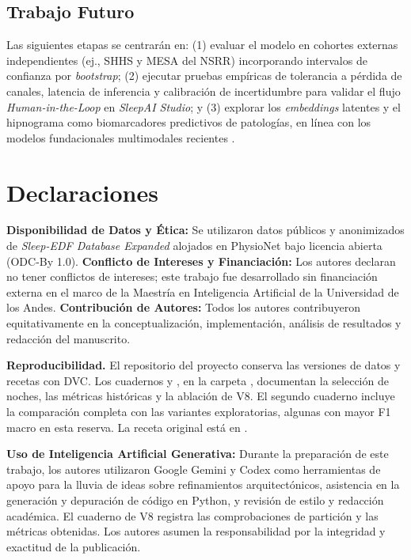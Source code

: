 \documentclass[conference]{IEEEtran}
\begin{document}
\subsection{Trabajo Futuro}
Las siguientes etapas se centrarán en: (1) evaluar el modelo en cohortes externas independientes (ej., SHHS y MESA del NSRR) incorporando intervalos de confianza por \textit{bootstrap}; (2) ejecutar pruebas empíricas de tolerancia a pérdida de canales, latencia de inferencia y calibración de incertidumbre para validar el flujo \textit{Human-in-the-Loop} en \textit{SleepAI Studio}; y (3) explorar los \textit{embeddings} latentes y el hipnograma como biomarcadores predictivos de patologías, en línea con los modelos fundacionales multimodales recientes \cite{thapa2026nature}.

\section*{Declaraciones}
\textbf{Disponibilidad de Datos y Ética:} Se utilizaron datos públicos y anonimizados de \textit{Sleep-EDF Database Expanded} alojados en PhysioNet bajo licencia abierta (ODC-By 1.0). \textbf{Conflicto de Intereses y Financiación:} Los autores declaran no tener conflictos de intereses; este trabajo fue desarrollado sin financiación externa en el marco de la Maestría en Inteligencia Artificial de la Universidad de los Andes. \textbf{Contribución de Autores:} Todos los autores contribuyeron equitativamente en la conceptualización, implementación, análisis de resultados y redacción del manuscrito.

\textbf{Reproducibilidad.} El repositorio del proyecto conserva las versiones de datos y recetas con DVC. Los cuadernos  y , en la carpeta , documentan la selección de noches, las métricas históricas y la ablación de V8. El segundo cuaderno incluye la comparación completa con las variantes exploratorias, algunas con mayor F1 macro en esta reserva. La receta original está en .

\textbf{Uso de Inteligencia Artificial Generativa:} Durante la preparación de este trabajo, los autores utilizaron Google Gemini y Codex como herramientas de apoyo para la lluvia de ideas sobre refinamientos arquitectónicos, asistencia en la generación y depuración de código en Python, y revisión de estilo y redacción académica. El cuaderno de V8 registra las comprobaciones de partición y las métricas obtenidas. Los autores asumen la responsabilidad por la integridad y exactitud de la publicación.
\end{document}
